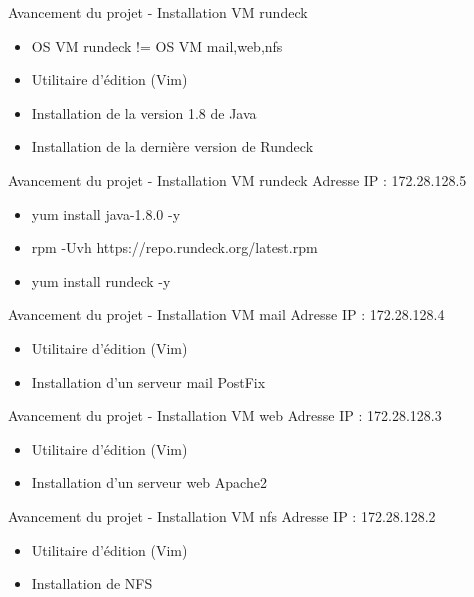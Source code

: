 \documentclass{beamer}
\begin{document}
\begin{frame}{Avancement du projet - Installation VM rundeck}
     \begin{itemize}
         \item OS VM rundeck != OS VM mail,web,nfs
         \item Utilitaire d'édition (Vim)
         \item Installation de la version 1.8 de Java
         \item Installation de la dernière version de Rundeck
     \end{itemize}
     
\end{frame}

\begin{frame}{Avancement du projet - Installation VM rundeck}
     Adresse IP : 172.28.128.5
     \begin{itemize}
         \item yum install java-1.8.0 -y
         \item rpm -Uvh https://repo.rundeck.org/latest.rpm
         \item yum install rundeck -y
     \end{itemize}
\end{frame}

\begin{frame}{Avancement du projet - Installation VM mail}
    Adresse IP : 172.28.128.4
    \begin{itemize}
        \item Utilitaire d'édition (Vim)
        \item Installation d'un serveur mail PostFix
    \end{itemize}
\end{frame}{}

\begin{frame}{Avancement du projet - Installation VM web}
    Adresse IP : 172.28.128.3
    \begin{itemize}
        \item Utilitaire d'édition (Vim)
        \item Installation d'un serveur web Apache2
    \end{itemize}
\end{frame}{}

\begin{frame}{Avancement du projet - Installation VM nfs}
    Adresse IP : 172.28.128.2
    \begin{itemize}
        \item Utilitaire d'édition (Vim)
        \item Installation de NFS
    \end{itemize}
\end{frame}{}
\end{document}
